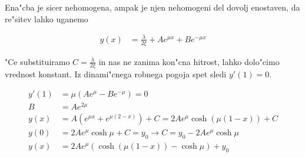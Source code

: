 \documentclass[12pt]{article}
\begin{document}
\begin{comment}


Ker je ena"cba nehomogena pa sta koeficienta pred obema re"sitvama lahko funkciji $x$, me"sanih odvodov pa se lahko znebimo, saj imamo na voljo eno prostostno stopnjo odve"c. 

\begin{align}
  y(x) &= A(x) e^ {\mu x} + B(x) e^{-\mu x} \\
  y'(x) &= A'(x) e^{\mu x} + A(x)\mu e^{\mu x} + B'(x) e^{-\mu x} - B(x) \mu e^{-\mu x} \\
  &= A(x)\mu  e^{\mu x} - B(x)\mu  e^{-\mu x} \\
  y''(x) &= A'(x) \mu e^{\mu x} + A(x) \mu^2 e^{\mu x} - B'(x) \mu e^{-\mu x} + B(x) \mu^2 e^{-\mu x} \\
  &= \mu(A'(x) e^{\mu x} - B'(x) e^{-\mu x}) + \xi y(x)
\end{align}

Funkciji $A$ in $B$ zado"s"cata sistemu dveh ena"cb


\begin{align}
  A'(x) e^{\mu x} + B'(x) e^{-\mu x} &= 0 \\
  A'(x) e^{\mu x} - B'(x) e^{-\mu x} &= \frac{-\lambda}{2\mu}
\end{align}

z re"sitvama

\begin{align}
  A'(x) &= \frac{-\lambda}{4\mu} e^{-\mu x} & A(x) &= \frac{\lambda}{4\xi}e^{-\mu x} + C\\
  B'(x) &= \frac{\lambda}{4\mu} e^{\mu x} & B(x) &= \frac{\lambda}{4\xi}e^{\mu x} + D
\end{align}

\end{comment}

Ena"cba je sicer nehomogena, ampak je njen nehomogeni del dovolj enostaven, da re"sitev lahko uganemo

\begin{align}
  y(x) &= \frac{\lambda}{2\xi} + A e^{\mu x} + B e^{-\mu x}
\end{align}

"Ce substituiramo $C = \frac{\lambda}{2\xi}$ in nas ne zanima kon"cna hitrost, lahko dolo"cimo vrednost konstant. Iz dinami"cnega robnega pogoja spet sledi $y'(1) = 0$. 

\begin{align}
 y'(1) &= \mu ( Ae^\mu - Be^{-\mu} ) = 0 \\
B &= Ae^{2\mu} \\
y(x) &= A( e^{\mu x} + e^{\mu (2-x)} ) + C = 2 A e^{\mu} \cosh ( \mu(1-x) ) + C \\
y(0) &= 2A e^{\mu} \cosh \mu + C = y_0 \rightarrow C = y_0 - 2Ae^\mu \cosh \mu \\
y(x) &= 2Ae^\mu ( \cosh (\mu (1-x)) - \cosh \mu ) + y_0
\end{align}
\end{document}
